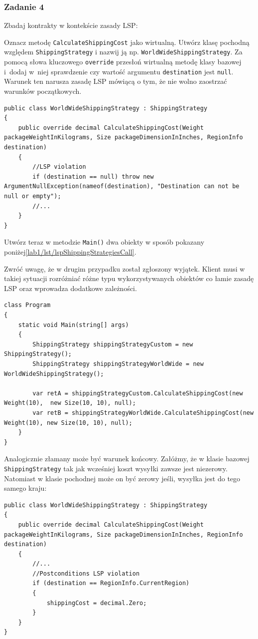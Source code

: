 \subsubsection{Zadanie 4}
Zbadaj kontrakty w kontekście zasady LSP:

Oznacz metodę \texttt{CalculateShippingCost} jako wirtualną. Utwórz klasę pochodną względem \texttt{ShippingStrategy} i nazwij ją np. \texttt{WorldWideShippingStrategy}. Za pomocą słowa kluczowego \texttt{override} przesłoń wirtualną metodę klasy bazowej i~dodaj w~niej sprawdzenie czy wartość argumentu \texttt{destination} jest \texttt{null}. Warunek ten narusza zasadę LSP mówiącą o tym, że nie wolno zaostrzać warunków początkowych. %
\begin{lstlisting}
public class WorldWideShippingStrategy : ShippingStrategy
{	
	public override decimal CalculateShippingCost(Weight packageWeightInKilograms, Size packageDimensionInInches, RegionInfo destination)
	{
		//LSP violation
		if (destination == null) throw new ArgumentNullException(nameof(destination), "Destination can not be null or empty");
		//...
	}
}
\end{lstlisting}

Utwórz teraz w metodzie \texttt{Main()} dwa obiekty w sposób pokazany poniżej\ref{lab1/lst/lspShippingStrategiesCall}. 

Zwróć uwagę, że w drugim przypadku został zgłoszony wyjątek. Klient musi w takiej sytuacji rozróżniać różne typu wykorzystywanych obiektów co łamie zasadę LSP oraz wprowadza dodatkowe zależności.  

\begin{lstlisting}[caption={Wywołanie metod klas ShippingStrategy oraz WolrdWideShippingStrategy}, label={lab1/lst/lspShippingStrategiesCall}]
class Program
{
	static void Main(string[] args)
	{
		ShippingStrategy shippingStrategyCustom = new ShippingStrategy();
		ShippingStrategy shippingStrategyWorldWide = new WorldWideShippingStrategy();
		
		var retA = shippingStrategyCustom.CalculateShippingCost(new Weight(10),  new Size(10, 10), null);
		var retB = shippingStrategyWorldWide.CalculateShippingCost(new Weight(10), new Size(10, 10), null);
	}
}
\end{lstlisting}

Analogicznie złamany może być warunek końcowy. Załóżmy, że w klasie bazowej \texttt{ShippingStrategy} tak jak wcześniej koszt wysyłki zawsze jest niezerowy. Natomiast w klasie pochodnej może on być zerowy jeśli, wysyłka jest do tego samego kraju: %
\begin{lstlisting}
public class WorldWideShippingStrategy : ShippingStrategy
{	
	public override decimal CalculateShippingCost(Weight packageWeightInKilograms, Size packageDimensionInInches, RegionInfo destination)
	{
		//...
		//Postconditions LSP violation 
		if (destination == RegionInfo.CurrentRegion)
		{
			shippingCost = decimal.Zero;
		}
	}
}
\end{lstlisting}


